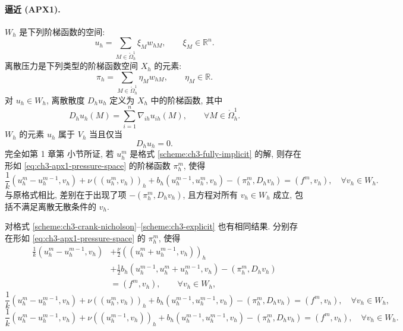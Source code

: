 \paragraph{逼近 (APX1).}
$W_h$ 是下列阶梯函数的空间:
\begin{equation}
u_h=\sum_{M\in\mathring\Omega_h^1}\xi_Mw_{hM},
\qquad\xi_M\in\mathbb R^n.
\label{eq:ch3-apx1-wh-step-functions}
\end{equation}
离散压力是下列类型的阶梯函数空间 $X_h$ 的元素:
\begin{equation}
\pi_h=\sum_{M\in\mathring\Omega_h^1}\eta_Mw_{hM},
\qquad\eta_M\in\mathbb R.
\label{eq:ch3-apx1-pressure-space}
\end{equation}
对 $u_h\in W_h$, 离散散度 $D_hu_h$ 定义为 $X_h$ 中的阶梯函数, 其中
\begin{equation}
D_hu_h(M)=\sum_{i=1}^n\nabla_{ih}u_{ih}(M),
\qquad\forall M\in\mathring\Omega_h^1.
\label{eq:ch3-apx1-discrete-divergence}
\end{equation}
$W_h$ 的元素 $u_h$ 属于 $V_h$ 当且仅当
\begin{equation}
D_hu_h=0.
\label{eq:ch3-apx1-divergence-free}
\end{equation}
完全如第 1 章第  小节所证, 若 $u_h^m$ 是格式 \ref{scheme:ch3-fully-implicit} 的解, 则存在形如 \eqref{eq:ch3-apx1-pressure-space} 的阶梯函数 $\pi_h^m$, 使得
\begin{equation}
\frac1k(u_h^m-u_h^{m-1},v_h)+\nu((u_h^m,v_h))_h
+b_h(u_h^{m-1},u_h^m,v_h)-(\pi_h^m,D_hv_h)
=(f^m,v_h),\quad\forall v_h\in W_h.
\label{eq:ch3-apx1-momentum-with-pressure}
\end{equation}
与原格式相比, 差别在于出现了项 $-(\pi_h^m,D_hv_h)$, 且方程对所有 $v_h\in W_h$ 成立, 包括不满足离散无散条件的 $v_h$.

\hypertarget{chapter-03-page-277}{}
对格式 \ref{scheme:ch3-crank-nicholson}--\ref{scheme:ch3-explicit} 也有相同结果. 分别存在形如 \eqref{eq:ch3-apx1-pressure-space} 的 $\pi_h^m$, 使得
\begin{equation}
\begin{split}
\frac1k(u_h^m-u_h^{m-1},v_h)&+\frac\nu2((u_h^m+u_h^{m-1},v_h))_h\\
&+\frac12b_h(u_h^{m-1},u_h^m+u_h^{m-1},v_h)-(\pi_h^m,D_hv_h)\\
&=(f^m,v_h),\qquad\forall v_h\in W_h,
\end{split}
\label{eq:ch3-pressure-scheme52}
\end{equation}
\begin{equation}
\frac1k(u_h^m-u_h^{m-1},v_h)+\nu((u_h^m,v_h))_h
+b_h(u_h^{m-1},u_h^{m-1},v_h)
-(\pi_h^m,D_hv_h)=(f^m,v_h),\quad\forall v_h\in W_h,
\label{eq:ch3-pressure-scheme53}
\end{equation}
\begin{equation}
\frac1k(u_h^m-u_h^{m-1},v_h)+\nu((u_h^{m-1},v_h))_h
+b_h(u_h^{m-1},u_h^{m-1},v_h)
-(\pi_h^m,D_hv_h)=(f^m,v_h),\quad\forall v_h\in W_h.
\label{eq:ch3-pressure-scheme54}
\end{equation}

